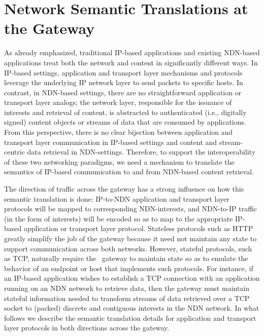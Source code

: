 \section{Network Semantic Translations at the Gateway} \label{sec:gateway}
As already emphasized, traditional IP-based applications and existing NDN-based applications treat both the network and content in significantly different ways. In IP-based settings, application and transport layer mechanisms and protocols leverage the underlying IP network layer to send packets to specific hosts. In contrast, in NDN-based settings, there are no straightforward application or transport layer analogs; the network layer, responsible for the issuance of interests and retrieval of content, is abstracted to authenticated (i.e., digitally signed) content objects or streams of data that are consumed by applications. From this perspective, there is no clear bijection between application and transport layer communication in IP-based settings and content and stream-centric data retrieval in NDN-settings. Therefore, to support the interoperability of these two networking paradigms, we need a mechanism to translate the semantics of IP-based communication to and from NDN-based content retrieval. 

The direction of traffic across the gateway has a strong influence on how this semantic translation is done: IP-to-NDN application and transport layer protocols will be mapped to corresponding NDN-interests, and NDN-to-IP traffic (in the form of interests) will be encoded so as to map to the appropriate IP-based application or transport layer protocol. Stateless protocols such as HTTP greatly simplify the job of the gateway because it need not maintain any state to support communication across both networks. However, stateful protocols, such as TCP, naturally require the \sink\ gateway to maintain state so as to emulate the behavior of an endpoint or host that implements such protocols. For instance, if an IP-based application wishes to establish a TCP connection with an application running on an NDN network to retrieve data, then the gateway must maintain stateful information needed to transform streams of data retrieved over a TCP socket to (packed) discrete and contiguous interests in the NDN network. In what follows we describe the semantic translation details for application and transport layer protocols in both directions across the gateway. 

